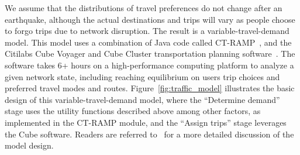 

We assume that the distributions of travel preferences do not change after an earthquake, although the actual destinations and trips will vary as people choose to forgo trips due to network disruption. The result is a variable-travel-demand model. This model uses a combination of Java code called CT-RAMP~\cite{davidson_ct-ramp_2010}, and the Citilabs Cube Voyager and Cube Cluster transportation planning software~\cite{erhardt_mtcs_2012}. The software takes 6+ hours on a high-performance computing platform to analyze a given network state, including reaching equilibrium on users trip choices and preferred travel modes and routes. Figure~\ref{fig:traffic_model} illustrates the basic design of this variable-travel-demand model, where the “Determine demand” stage uses the utility functions described above among other factors, as implemented in the CT-RAMP module, and the “Assign trips” stage leverages the Cube software. Readers are referred to~\cite{miller_seismic_2014} for a more detailed discussion of the model design. 

